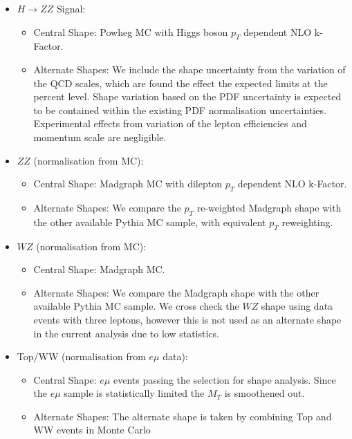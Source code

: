 \begin{itemize}

    \item {{$H\rightarrow ZZ$ Signal}}:
    \begin{itemize}
        \item Central Shape: Powheg MC with Higgs boson $p_T$ dependent NLO k-Factor.
        \item Alternate Shapes: We include the shape uncertainty from the variation of 
the QCD scales, which are found the effect the expected limits at the percent level.
Shape variation based on the PDF uncertainty is expected to be contained within the
existing PDF normalisation uncertainties. Experimental effects from variation of the lepton
efficiencies and momentum scale are negligible.
    \end{itemize}

    \item {{$ZZ$}} (normalisation from MC): 
    \begin{itemize}
        \item Central Shape: Madgraph MC with dilepton $p_T$ dependent NLO k-Factor.
        \item Alternate Shapes: We compare the $p_T$ re-weighted Madgraph shape
with the other available Pythia MC sample, with equivalent $p_T$ reweighting. 
    \end{itemize}

    \item {{$WZ$}} (normalisation from MC):
    \begin{itemize}
        \item Central Shape: Madgraph MC.
        \item Alternate Shapes: We compare the Madgraph shape
with the other available Pythia MC sample.%
We cross check the $WZ$ shape using data events with three leptons,
however this is not used as an alternate shape in the current analysis due to low statistics.
    \end{itemize}

    \item {{Top/WW}} (normalisation from $e\mu$ data):
    \begin{itemize}
        \item Central Shape: $e\mu$ events passing the selection for shape analysis. Since 
the $e\mu$ sample is statistically limited the $M_{T}$ is smoothened out. 
        \item Alternate Shapes: The alternate shape is taken by combining Top and WW events 
in Monte Carlo
    \end{itemize}


\end{itemize}
